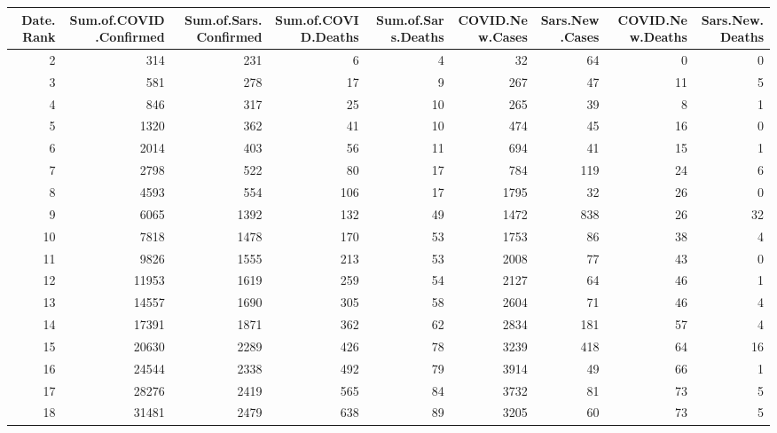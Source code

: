 \documentclass[
]{article}
\newenvironment{Shaded}{\begin{snugshade}}{\end{snugshade}}
\newcommand{\DataTypeTok}[1]{\textcolor[rgb]{0.13,0.29,0.53}{#1}}
\newcommand{\KeywordTok}[1]{\textcolor[rgb]{0.13,0.29,0.53}{\textbf{#1}}}
\newcommand{\NormalTok}[1]{#1}
\newcommand{\OperatorTok}[1]{\textcolor[rgb]{0.81,0.36,0.00}{\textbf{#1}}}
\newcommand{\StringTok}[1]{\textcolor[rgb]{0.31,0.60,0.02}{#1}}
\begin{document}
\begin{Shaded}
\end{Shaded}

\begin{table}[H]
\centering
\begin{tabular}{r|r|r|r|r|r|r|r|r}
\hline
Date.Rank & Sum.of.COVID.Confirmed & Sum.of.Sars.Confirmed & Sum.of.COVID.Deaths & Sum.of.Sars.Deaths & COVID.New.Cases & Sars.New.Cases & COVID.New.Deaths & Sars.New.Deaths\\
\hline
2 & 314 & 231 & 6 & 4 & 32 & 64 & 0 & 0\\
\hline
3 & 581 & 278 & 17 & 9 & 267 & 47 & 11 & 5\\
\hline
4 & 846 & 317 & 25 & 10 & 265 & 39 & 8 & 1\\
\hline
5 & 1320 & 362 & 41 & 10 & 474 & 45 & 16 & 0\\
\hline
6 & 2014 & 403 & 56 & 11 & 694 & 41 & 15 & 1\\
\hline
7 & 2798 & 522 & 80 & 17 & 784 & 119 & 24 & 6\\
\hline
8 & 4593 & 554 & 106 & 17 & 1795 & 32 & 26 & 0\\
\hline
9 & 6065 & 1392 & 132 & 49 & 1472 & 838 & 26 & 32\\
\hline
10 & 7818 & 1478 & 170 & 53 & 1753 & 86 & 38 & 4\\
\hline
11 & 9826 & 1555 & 213 & 53 & 2008 & 77 & 43 & 0\\
\hline
12 & 11953 & 1619 & 259 & 54 & 2127 & 64 & 46 & 1\\
\hline
13 & 14557 & 1690 & 305 & 58 & 2604 & 71 & 46 & 4\\
\hline
14 & 17391 & 1871 & 362 & 62 & 2834 & 181 & 57 & 4\\
\hline
15 & 20630 & 2289 & 426 & 78 & 3239 & 418 & 64 & 16\\
\hline
16 & 24544 & 2338 & 492 & 79 & 3914 & 49 & 66 & 1\\
\hline
17 & 28276 & 2419 & 565 & 84 & 3732 & 81 & 73 & 5\\
\hline
18 & 31481 & 2479 & 638 & 89 & 3205 & 60 & 73 & 5\\

\end{tabular}
\end{table}
\end{document}
